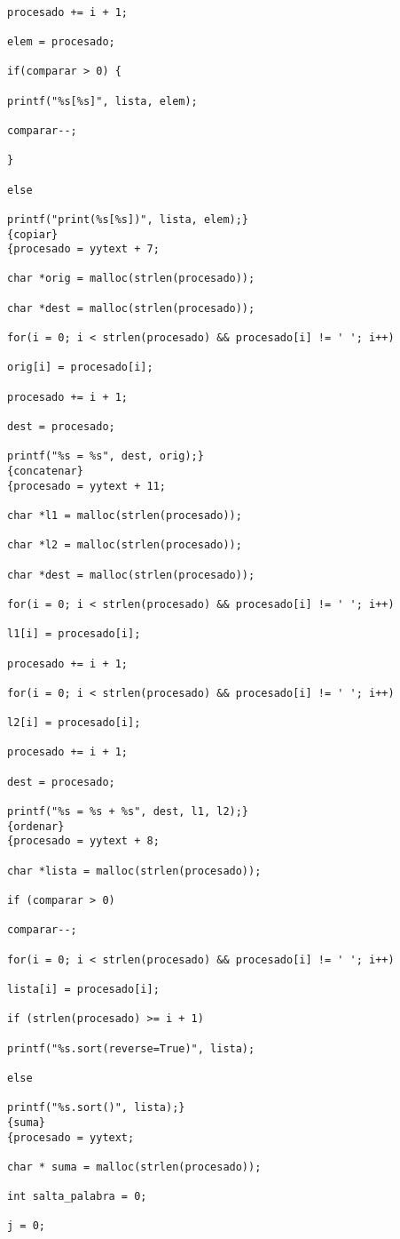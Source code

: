 \documentclass[11pt,a4paper]{article}
\begin{document}
\begin{lstlisting}
																		procesado += i + 1;
																		elem = procesado;
																		if(comparar > 0) {
																			printf("%s[%s]", lista, elem);
																			comparar--;
																		}
																		else
																			printf("print(%s[%s])", lista, elem);}
{copiar}															{procesado = yytext + 7;
																		char *orig = malloc(strlen(procesado));
																		char *dest = malloc(strlen(procesado));
																		for(i = 0; i < strlen(procesado) && procesado[i] != ' '; i++)
																			orig[i] = procesado[i];
																		procesado += i + 1;
																		dest = procesado;
																		printf("%s = %s", dest, orig);}
{concatenar}														{procesado = yytext + 11;
																		char *l1 = malloc(strlen(procesado));
																		char *l2 = malloc(strlen(procesado));
																		char *dest = malloc(strlen(procesado));
																		for(i = 0; i < strlen(procesado) && procesado[i] != ' '; i++)
																			l1[i] = procesado[i];
																		procesado += i + 1;
																		for(i = 0; i < strlen(procesado) && procesado[i] != ' '; i++)
																			l2[i] = procesado[i];
																		procesado += i + 1;
																		dest = procesado;
																		printf("%s = %s + %s", dest, l1, l2);}
{ordenar}															{procesado = yytext + 8;
																		char *lista = malloc(strlen(procesado));
																		if (comparar > 0)
																			comparar--;
																		for(i = 0; i < strlen(procesado) && procesado[i] != ' '; i++)
																			lista[i] = procesado[i];
																		if (strlen(procesado) >= i + 1)
																			printf("%s.sort(reverse=True)", lista);
																		else
																			printf("%s.sort()", lista);}
{suma}																{procesado = yytext;
																		char * suma = malloc(strlen(procesado));
																		int salta_palabra = 0;
																		j = 0;


\end{lstlisting}
\end{document}
